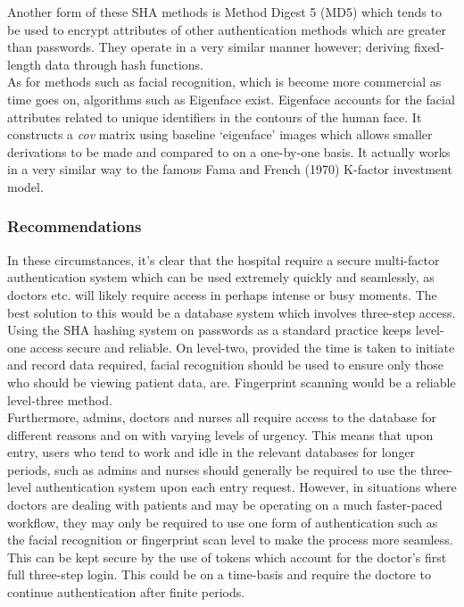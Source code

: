 \documentclass[11pt, english]{article}
\begin{document}
	Another form of these SHA methods is Method Digest 5 (MD5) which tends to be used to encrypt attributes of other authentication methods which are greater than passwords. They operate in a very similar manner however; deriving fixed-length data through hash functions.\\

	As for methods such as facial recognition, which is become more commercial as time goes on, algorithms such as Eigenface exist. Eigenface accounts for the facial attributes related to unique identifiers in the contours of the human face. It constructs a \textit{cov} matrix using baseline `eigenface' images which allows smaller derivations to be made and compared to on a one-by-one basis. It actually works in a very similar way to the famous Fama and French (1970) K-factor investment model. 

		\subsubsection{Recommendations}

	In these circumstances, it's clear that the hospital require a secure multi-factor authentication system which can be used extremely quickly and seamlessly, as doctors etc. will likely require access in perhaps intense or busy moments. The best solution to this would be a database system which involves three-step access. Using the SHA hashing system on passwords as a standard practice keeps level-one access secure and reliable. On level-two, provided the time is taken to initiate and record data required, facial recognition should be used to ensure only those who should be viewing patient data, are. Fingerprint scanning would be a reliable level-three method.\\

	Furthermore, admins, doctors and nurses all require access to the database for different reasons and on with varying levels of urgency. This means that upon entry, users who tend to work and idle in the relevant databases for longer periods, such as admins and nurses should generally be required to use the three-level authentication system upon each entry request. However, in situations where doctors are dealing with patients and may be operating on a much faster-paced workflow, they may only be required to use one form of authentication such as the facial recognition or fingerprint scan level to make the process more seamless. This can be kept secure by the use of tokens which account for the doctor's first full three-step login. This could be on a time-basis and require the doctore to continue authentication after finite periods. 
\end{document}
